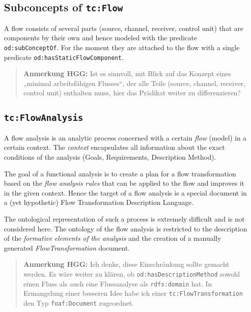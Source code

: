 \documentclass[11pt,a4paper]{article}
\newcommand{\HGG}[1]{\begin{quote}\textbf{Anmerkung HGG:} #1\end{quote}}
\begin{document}
\subsection{Subconcepts of \texttt{tc:Flow}}

A flow consists of several parts (source, channel, receiver, control unit)
that are components by their own and hence modeled with the predicate
\texttt{od:subConceptOf}. For the moment they are attached to the flow with a
single predicate \texttt{od:hasStaticFlowComponent}.

\HGG{Ist es sinnvoll, mit Blick auf das Konzept eines „minimal arbeitsfähigen
  Flusses“, der alle Teile (source, channel, receiver, control unit) enthalten
  muss, hier das Prädikat weiter zu differenzieren?}

\subsection{\texttt{tc:FlowAnalysis}}

A flow analysis is an analytic process concerned with a certain \emph{flow}
(model) in a certain context.  The \emph{context} encapsulates all information
about the exact conditions of the analysis (Goals, Requirements, Description
Method).

The goal of a functional analysis is to create a plan for a flow
transformation based on the \emph{flow analysis rules} that can be applied to
the flow and improves it in the given context. Hence the target of a flow
analysis is a special document in a (yet hypothetic) Flow Transformation
Description Language.

The ontological representation of such a process is extremely difficult and is
not considered here. The ontology of the flow analysis is restricted to the
description of the \emph{formative elements of the analysis} and the creation
of a manually generated \emph{FlowTransformation} document.

\HGG{Ich denke, diese Einschränkung sollte gemacht werden. Es wäre weiter zu
  klären, ob \texttt{od:hasDescriptionMethod} sowohl einen Fluss als auch eine
Flussanalyse als \texttt{rdfs:domain} hat. In Ermangelung einer besseren Idee
habe ich einer \texttt{tc:FlowTransformation} den Typ \texttt{foaf:Document}
zugeordnet. }
\end{document}
